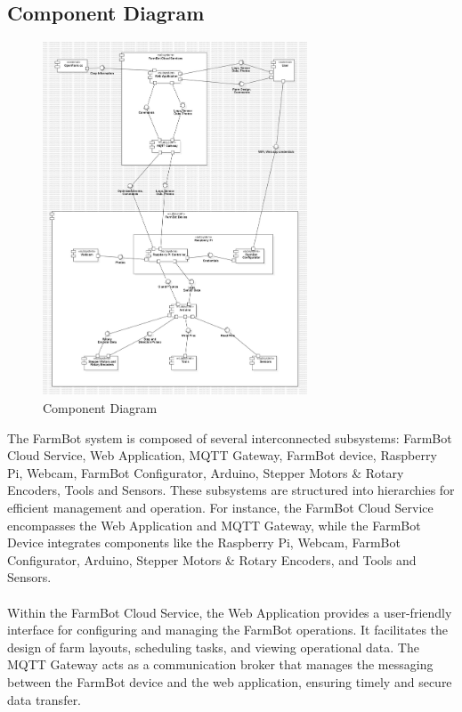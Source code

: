 \subsection{Component Diagram}
\begin{figure}[htbp]
    \centering
    \includegraphics[width=0.7\textwidth]{Figures/component_diagram.jpg}
    \caption{Component Diagram}
    \label{Component}
\end{figure}
\newpage
The FarmBot system is composed of several interconnected subsystems: FarmBot Cloud Service, Web Application, MQTT Gateway, FarmBot device, Raspberry Pi, Webcam, FarmBot Configurator, Arduino, Stepper Motors \& Rotary Encoders, Tools and Sensors. These subsystems are structured into hierarchies for efficient management and operation. For instance, the FarmBot Cloud Service encompasses the Web Application and MQTT Gateway, while the FarmBot Device integrates components like the Raspberry Pi, Webcam, FarmBot Configurator, Arduino, Stepper Motors \& Rotary Encoders, and Tools and Sensors.\\\\
Within the FarmBot Cloud Service, the Web Application provides a user-friendly interface for configuring and managing the FarmBot operations. It facilitates the design of farm layouts, scheduling tasks, and viewing operational data. The MQTT Gateway acts as a communication broker that manages the messaging between the FarmBot device and the web application, ensuring timely and secure data transfer.\\\\
